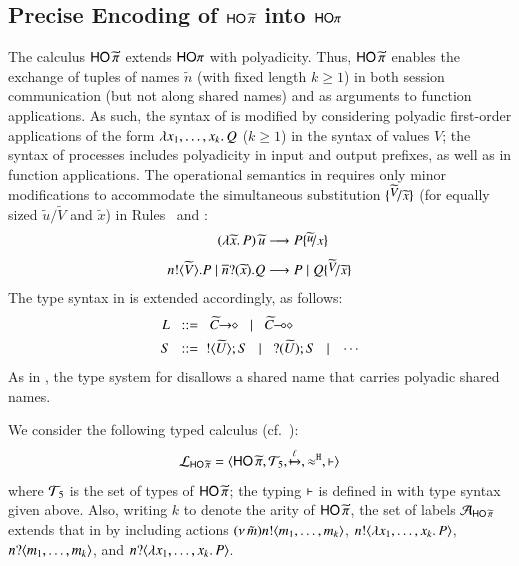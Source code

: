 \documentclass[preprint,11pt]{elsarticle}
\begin{document}
{\subsection{Precise Encoding of $\mathsf{HO}\,{\widetilde{\pi}}$ into $\mathsf{HO}\pi$}\label{ss:poly}
The calculus  
$\mathsf{HO}\,{\widetilde{\pi}}$ 
extends $\mathsf{HO}\pi$ 
with polyadicity.
Thus, $\mathsf{HO}\,{\widetilde{\pi}}$  enables the exchange of tuples of names $\widetilde{n}$ (with fixed length $k \geq 1$) in both session communication (but not along shared names) and as arguments 
to function applications.
As such, the syntax of
is modified by considering  
polyadic first-order applications of the form
 $\lambda x_1, \ldots, x_k.\,Q$ ($k \geq 1$)
 in the syntax of values $V$;
the syntax of processes includes polyadicity in input and output prefixes, 
 as well as in function applications. 
The operational semantics in  requires only minor modifications to accommodate the simultaneous substitution $\subst{\widetilde{V}}{\widetilde{x}}$ (for equally sized $\widetilde{u}/\widetilde{V}$ and $\widetilde{x}$)
in Rules~ and :
	\begin{align*}
		\appl{(\abs{\widetilde{x}}{P})}{\widetilde{u}}   & \red  P \subst{\widetilde{u}}{x} 
		\\[1mm]
		\bout{n}{\widetilde{V}} P \Par \binp{\dual{n}}{\widetilde{x}} Q & \red  P \Par Q \subst{\widetilde{V}}{\widetilde{x}} 
	\end{align*}
The type syntax in  is extended accordingly, as follows:
%
\begin{align*}
		L & \bnfis \shot{\widetilde{C}} \bnfbar \lhot{\widetilde{C}}
		\\
		S & \bnfis  \btout{\widetilde{U}} S \bnfbar \btinp{\widetilde{U}} S \bnfbar \cdots
\end{align*}
As in \cite{tlca07,MostrousY15},
the type system for \PHOp 
disallows a shared name that carries polyadic
shared names.

We consider the following typed calculus
 (cf.~):
	$$\mathcal{L}_{\mathsf{HO}\,{\widetilde{\pi}}}=\langle \mathsf{HO}\,{\widetilde{\pi}}, {\cal{T}}_5, \xmapsto{\ell}, \approx^\mathtt{H}, \vdash \rangle$$
where 
	${\cal{T}}_5$ is the set of types of $\mathsf{HO}\,{\widetilde{\pi}}$;  
the typing $\vdash$ is defined
in 
with  type syntax given above.
Also, writing $k$ to denote the arity of $\mathsf{HO}\,{\widetilde{\pi}}$, the set of labels 
$\mathcal{A}_{\mathsf{HO}\,{\widetilde{\pi}}}$ extends that in  by 
including actions
$(\nu\, \tilde{m}) n ! \langle m_1, \ldots, m_k \rangle$,
$n ! \langle \lambda x_1, \ldots, x_k.\,P \rangle$,
$ n ? \langle m_1, \ldots, m_k \rangle$,
and
$n ? \langle \lambda x_1, \ldots, x_k.\,P \rangle$.

}
\end{document}
